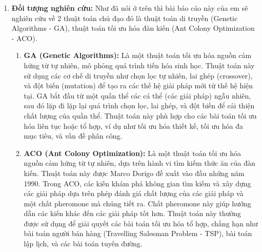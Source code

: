 \documentclass[14pt]{article}
\begin{document}
\begin{enumerate}
		\item\textbf{Đối tượng nghiên cứu:}	Như đã nói ở trên thì bài báo cáo này của em sẽ nghiên cứu về 2 thuật toán chủ đạo đó là thuật toán di truyền (Genetic Algorithms - GA), thuật toán tối ưu hóa đàn kiến (Ant Colony Optimization - ACO).
		\begin{enumerate}
			\item \textbf{GA (Genetic Algorithms):} Là một thuật toán tối ưu hóa nguồn cảm hứng từ tự nhiên, mô phỏng quá trình tiến hóa sinh học. Thuật toán này sử dụng các cơ chế di truyền như chọn lọc tự nhiên, lai ghép (crossover), và đột biến (mutation) để tạo ra các thế hệ giải pháp mới từ thế hệ hiện tại. GA bắt đầu từ một quần thể các cá thể (các giải pháp) ngẫu nhiên, sau đó lặp đi lặp lại quá trình chọn lọc, lai ghép, và đột biến để cải thiện chất lượng của quần thể. Thuật toán này phù hợp cho các bài toán tối ưu hóa liên tục hoặc tổ hợp, ví dụ như tối ưu hóa thiết kế, tối ưu hóa đa mục tiêu, và vấn đề phân công.
			\item \textbf{ACO (Ant Colony Optimization):} Là một thuật toán tối ưu hóa nguồn cảm hứng từ tự nhiên, dựa trên hành vi tìm kiếm thức ăn của đàn kiến. Thuật toán này được Marco Dorigo đề xuất vào đầu những năm 1990. Trong ACO, các kiến khám phá không gian tìm kiếm và xây dựng các giải pháp dựa trên phép đánh giá chất lượng của các giải pháp và một chất pheromone mà chúng tiết ra. Chất pheromone này giúp hướng dẫn các kiến khác đến các giải pháp tốt hơn. Thuật toán này thường được sử dụng để giải quyết các bài toán tối ưu hóa tổ hợp, chẳng hạn như bài toán người bán hàng (Travelling Salesman Problem - TSP), bài toán lập lịch, và các bài toán tuyến đường.
			\end{enumerate}
	\end{enumerate}
\end{document}
